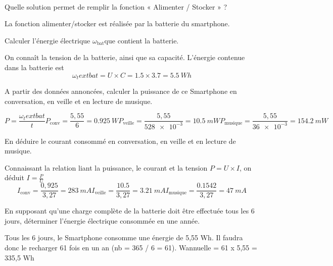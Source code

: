 \documentclass[10pt,fleqn]{article} %
\begin{document}
\begin{exercise}~

\begin{question}
  Quelle solution permet de remplir la fonction « Alimenter / Stocker » ?
\end{question} 
\begin{solution}
  La fonction alimenter/stocker est réalisée par la batterie du smartphone. 
\end{solution}

\begin{question}
  Calculer l’énergie électrique $\omega_\text{bat}$que contient la batterie.
\end{question}
\begin{solution}
  On connaît la tension de la batterie, ainsi que sa capacité. L'énergie 
  contenue dans la batterie est $$\omega_text{bat} = U\times C = 1.5\times 3.7 =\SI{5.5}{Wh} $$
\end{solution}

\begin{question}
  A partir des données annoncées, calculer la puissance de ce Smartphone en 
  conversation, en veille et en lecture de musique. 
\end{question}
\begin{solution}
$$P = \frac{\omega_text{bat}}{t}
P_{\text{conv}} = \frac{5,55}{6} = \SI{0.925}{W}
P_{\text{veille}} = \frac{5,55}{\num{528e-3}} = \SI{10.5}{mW}
P_{\text{musique}} = \frac{5,55}{\num{36e-3}} = \SI{154.2}{mW}$$
\end{solution}

\begin{question}
  En déduire le courant consommé en conversation, en veille et en lecture de musique.
\end{question}
\begin{solution}
  Connaissant la relation liant la puissance, le courant et la tension 
  $P=U\times I$, on déduit $I = \frac{P}{U}$
  $$
 I_{\text{conv}} = \frac{0,925}{3,27} = \SI{283}{mA}
  I_{\text{veille}} = \frac{10.5}{3,27} = \SI{3.21}{mA}
   I_{\text{musique}} = \frac{0.1542}{3,27} = \SI{47}{mA}$$
\end{solution}

\begin{question}
  En supposant qu’une charge complète de la batterie doit être effectuée tous les 6 jours, déterminer l’énergie électrique consommée en une année.
\end{question}
\begin{solution}
  Tous les 6 jours, le Smartphone consomme une énergie de 5,55 Wh.
Il faudra donc le recharger 61 fois en un an (nb = 365 / 6 = 61).
Wannuelle = 61 x 5,55 = 335,5 Wh
\end{solution}


\end{exercise}
\end{document}
